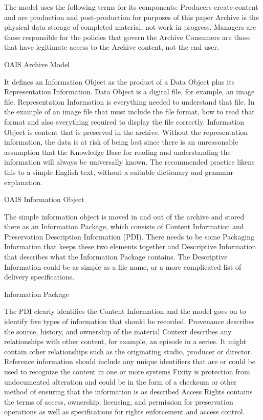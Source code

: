 The model uses the following terms for its components:
Producers create content and are production and post-production for purposes of this paper
Archive is the physical data storage of completed material, not work in progress.
Managers are those responsible for the policies that govern the Archive
Consumers are those that have legitimate access to the Archive content, not the end user.


OAIS Archive Model

It defines an Information Object as the product of a Data Object plus its Representation Information.
Data Object is a digital file, for example, an image file.
Representation Information is everything needed to understand that file. In the example of an image file that must include the file format, how to read that format and also everything required to display the file correctly.
Information Object is content that is preserved in the archive. Without the representation information, the data is at risk of being lost since there is an unreasonable assumption that the Knowledge Base for reading and understanding the information will always be universally known. The recommended practice likens this to a simple English text, without a suitable dictionary and grammar explanation.

OAIS Information Object

The simple information object is moved in and out of the archive and stored there as an Information Package, which consists of Content Information and Preservation Description Information (PDI). There needs to be some Packaging Information that keeps these two elements together and Descriptive Information that describes what the Information Package contains. The Descriptive Information could be as simple as a file name, or a more complicated list of delivery specifications.

Information Package

The PDI clearly identifies the Content Information and the model goes on to identify five types of information that should be recorded.
	Provenance describes the source, history, and ownership of the material
	Context describes any relationships with other content, for example, an episode in a series. It might contain other relationships such as the originating studio, producer or director.
	Reference information should include any unique identifiers that are or could be used to recognize the content in one or more systems
	Fixity is protection from undocumented alteration and could be in the form of a checksum or other method of ensuring that the information is as described
	Access Rights contains the terms of access, ownership, licensing, and permission for preservation operations as well as specifications for rights enforcement and access control.

